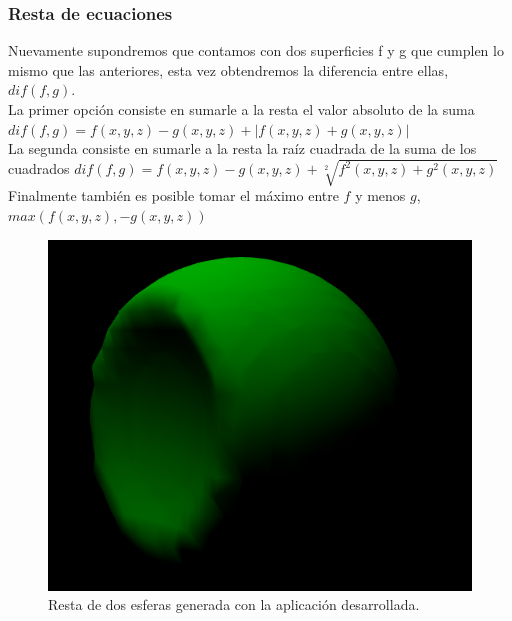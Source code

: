 \documentclass[12pt]{article}
\begin{document}
\subsubsection{Resta de ecuaciones}
Nuevamente supondremos que contamos con dos superficies f y g que cumplen lo mismo que las anteriores, esta vez obtendremos la diferencia entre ellas, $dif(f,g)$.
\\La primer opción consiste en sumarle a la resta el valor absoluto de la suma $dif(f,g) = f(x,y,z) - g(x,y,z) + |f(x,y,z) + g(x,y,z)|$
\\La segunda consiste en sumarle a la resta la raíz cuadrada de la suma de los cuadrados $dif(f,g) = f(x,y,z) - g(x,y,z) + \sqrt[2]{f^2(x,y,z) + g^2(x,y,z)}$ 
\\Finalmente también es posible tomar el máximo entre $f$ y menos $g$, $max(f(x,y,z),-g(x,y,z))$
\begin{figure}[h]
\includegraphics[width=\linewidth,center]{oi3.png}
\caption{Resta de dos esferas generada con la aplicación desarrollada.}
\end{figure}
\clearpage
\end{document}
